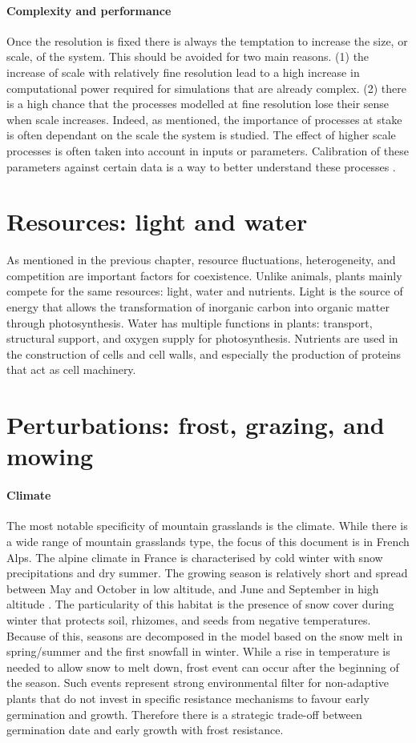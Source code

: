 \paragraph{Complexity and performance}
Once the resolution is fixed there is always the temptation to increase the size, or scale, of the system. This should be avoided for two main reasons. (1) the increase of scale with relatively fine resolution lead to a high increase in computational power required for simulations that are already complex. (2) there is a high chance that the processes modelled at fine resolution lose their sense when scale increases. Indeed, as mentioned, the importance of processes at stake is often dependant on the scale the system is studied. The effect of higher scale processes is often taken into account in inputs or parameters. Calibration of these parameters against certain data is a way to better understand these processes \parencite{lagarrigues_approximate_2015}. 

\section{Resources: light and water}
As mentioned in the previous chapter, resource fluctuations, heterogeneity, and competition are important factors for coexistence. Unlike animals, plants mainly compete for the same resources: light, water and nutrients. Light is the source of energy that allows the transformation of inorganic carbon into organic matter through photosynthesis. Water has multiple functions in plants: transport, structural support, and oxygen supply for photosynthesis. Nutrients are used in the construction of cells and cell walls, and especially the production of proteins that act as cell machinery.

\section{Perturbations: frost, grazing, and mowing}
\paragraph{Climate}
The most notable specificity of mountain grasslands is the climate. While there is a wide range of mountain grasslands type, the focus of this document is in French Alps. The alpine climate in France is characterised by cold winter with snow precipitations and dry summer. The growing season is relatively short and spread between May and October in low altitude, and June and September in high altitude \parencite{korner_alpine_2003}. The particularity of this habitat is the presence of snow cover during winter that protects soil, rhizomes, and seeds from negative temperatures. Because of this, seasons are decomposed in the model based on the snow melt in spring/summer and the first snowfall in winter. While a rise in temperature is needed to allow snow to melt down, frost event can occur after the beginning of the season. Such events represent strong environmental filter for non-adaptive plants that do not invest in specific resistance mechanisms to favour early germination and growth. Therefore there is a strategic trade-off between germination date and early growth with frost resistance.


